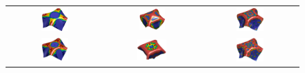 \begin{figure}[hbtp!]
\begin{tabular}{ccc}
\includegraphics[width=0.30\textwidth]{Figures/Example2/Pressure/Paraview200v2} &
\includegraphics[width=0.30\textwidth]{Figures/Example2/Pressure/Paraview300v2}&
\includegraphics[width=0.30\textwidth]{Figures/Example2/Pressure/Paraview590v2} \\
\includegraphics[width=0.30\textwidth]{Figures/Example2/Pressure/Paraview210v2}&\includegraphics[width=0.34\textwidth]{Figures/Example2/Pressure/Paraview400v2}&\includegraphics[width=0.30\textwidth]{Figures/Example2/Pressure/Paraview600v2}\\		

\end{tabular}
\end{figure}
